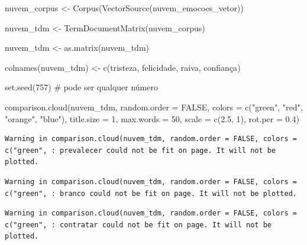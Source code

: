 \documentclass[
  12pt,
]{report}
\newenvironment{Shaded}{\begin{snugshade}}{\end{snugshade}}
\newcommand{\AttributeTok}[1]{\textcolor[rgb]{0.40,0.45,0.13}{#1}}
\newcommand{\CommentTok}[1]{\textcolor[rgb]{0.37,0.37,0.37}{#1}}
\newcommand{\ConstantTok}[1]{\textcolor[rgb]{0.56,0.35,0.01}{#1}}
\newcommand{\DecValTok}[1]{\textcolor[rgb]{0.68,0.00,0.00}{#1}}
\newcommand{\FloatTok}[1]{\textcolor[rgb]{0.68,0.00,0.00}{#1}}
\newcommand{\FunctionTok}[1]{\textcolor[rgb]{0.28,0.35,0.67}{#1}}
\newcommand{\NormalTok}[1]{\textcolor[rgb]{0.00,0.23,0.31}{#1}}
\newcommand{\OtherTok}[1]{\textcolor[rgb]{0.00,0.23,0.31}{#1}}
\newcommand{\StringTok}[1]{\textcolor[rgb]{0.13,0.47,0.30}{#1}}
\begin{document}
\begin{Shaded}
\begin{Highlighting}[]
\NormalTok{nuvem\_corpus }\OtherTok{\textless{}{-}} \FunctionTok{Corpus}\NormalTok{(}\FunctionTok{VectorSource}\NormalTok{(nuvem\_emocoes\_vetor))}

\NormalTok{nuvem\_tdm }\OtherTok{\textless{}{-}} \FunctionTok{TermDocumentMatrix}\NormalTok{(nuvem\_corpus)}

\NormalTok{nuvem\_tdm }\OtherTok{\textless{}{-}} \FunctionTok{as.matrix}\NormalTok{(nuvem\_tdm)}

\FunctionTok{colnames}\NormalTok{(nuvem\_tdm) }\OtherTok{\textless{}{-}} \FunctionTok{c}\NormalTok{(}\StringTok{\textquotesingle{}tristeza\textquotesingle{}}\NormalTok{, }\StringTok{\textquotesingle{}felicidade\textquotesingle{}}\NormalTok{, }\StringTok{\textquotesingle{}raiva\textquotesingle{}}\NormalTok{, }\StringTok{\textquotesingle{}confiança\textquotesingle{}}\NormalTok{)}

\FunctionTok{set.seed}\NormalTok{(}\DecValTok{757}\NormalTok{) }\CommentTok{\# pode ser qualquer número}

\FunctionTok{comparison.cloud}\NormalTok{(nuvem\_tdm, }\AttributeTok{random.order =} \ConstantTok{FALSE}\NormalTok{,}
                 \AttributeTok{colors =} \FunctionTok{c}\NormalTok{(}\StringTok{"green"}\NormalTok{, }\StringTok{"red"}\NormalTok{, }\StringTok{"orange"}\NormalTok{, }\StringTok{"blue"}\NormalTok{),}
                 \AttributeTok{title.size =} \DecValTok{1}\NormalTok{, }\AttributeTok{max.words =} \DecValTok{50}\NormalTok{, }\AttributeTok{scale =} \FunctionTok{c}\NormalTok{(}\FloatTok{2.5}\NormalTok{, }\DecValTok{1}\NormalTok{), }\AttributeTok{rot.per =} \FloatTok{0.4}\NormalTok{)}
\end{Highlighting}
\end{Shaded}

\begin{verbatim}
Warning in comparison.cloud(nuvem_tdm, random.order = FALSE, colors =
c("green", : prevalecer could not be fit on page. It will not be plotted.
\end{verbatim}

\begin{verbatim}
Warning in comparison.cloud(nuvem_tdm, random.order = FALSE, colors =
c("green", : branco could not be fit on page. It will not be plotted.
\end{verbatim}

\begin{verbatim}
Warning in comparison.cloud(nuvem_tdm, random.order = FALSE, colors =
c("green", : contratar could not be fit on page. It will not be plotted.
\end{verbatim}
\end{document}
